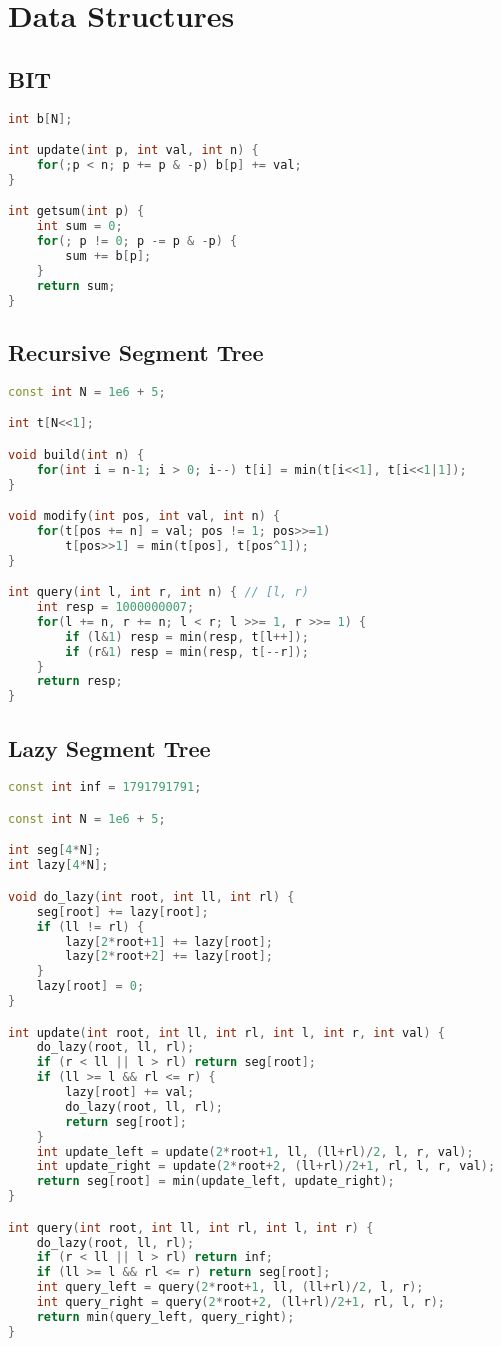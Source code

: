 \documentclass{article}
\begin{document}
\section{Data Structures}
\subsection{BIT}
\begin{lstlisting}[language=C++]
int b[N];

int update(int p, int val, int n) {
	for(;p < n; p += p & -p) b[p] += val;
}

int getsum(int p) {
	int sum = 0;
	for(; p != 0; p -= p & -p) {
		sum += b[p];
	}
	return sum;
}
\end{lstlisting}
\subsection{Recursive Segment Tree}
\begin{lstlisting}[language=C++]
const int N = 1e6 + 5;

int t[N<<1];

void build(int n) {
	for(int i = n-1; i > 0; i--) t[i] = min(t[i<<1], t[i<<1|1]);
}

void modify(int pos, int val, int n) {
	for(t[pos += n] = val; pos != 1; pos>>=1)
		t[pos>>1] = min(t[pos], t[pos^1]);
}

int query(int l, int r, int n) { // [l, r)
	int resp = 1000000007;
	for(l += n, r += n; l < r; l >>= 1, r >>= 1) {
		if (l&1) resp = min(resp, t[l++]);
		if (r&1) resp = min(resp, t[--r]);
	}
	return resp;
}
\end{lstlisting}
\subsection{Lazy Segment Tree}
\begin{lstlisting}[language=C++]
const int inf = 1791791791;

const int N = 1e6 + 5;

int seg[4*N];
int lazy[4*N];

void do_lazy(int root, int ll, int rl) {
	seg[root] += lazy[root];
	if (ll != rl) {
		lazy[2*root+1] += lazy[root];
		lazy[2*root+2] += lazy[root];
	}
	lazy[root] = 0;
}

int update(int root, int ll, int rl, int l, int r, int val) {
	do_lazy(root, ll, rl);
	if (r < ll || l > rl) return seg[root];
	if (ll >= l && rl <= r) {
		lazy[root] += val;
		do_lazy(root, ll, rl);
		return seg[root];
	}
	int update_left = update(2*root+1, ll, (ll+rl)/2, l, r, val);
	int update_right = update(2*root+2, (ll+rl)/2+1, rl, l, r, val);
	return seg[root] = min(update_left, update_right);
}

int query(int root, int ll, int rl, int l, int r) {
	do_lazy(root, ll, rl);
	if (r < ll || l > rl) return inf;
	if (ll >= l && rl <= r) return seg[root];
	int query_left = query(2*root+1, ll, (ll+rl)/2, l, r);
	int query_right = query(2*root+2, (ll+rl)/2+1, rl, l, r);
	return min(query_left, query_right); 
}
\end{lstlisting}
\end{document}
